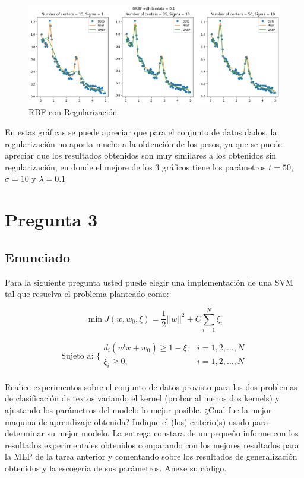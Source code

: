 \documentclass{article}
\theoremstyle{mytheoremstyle}
\theoremstyle{mytheoremstyle}
\theoremstyle{myproblemstyle}
\begin{document}
\begin{itemize}
        \begin{figure}[!ht]
          \centering
          \includegraphics[width=1\textwidth]{./imgs/RBF/rbf_r.png}
          \caption{RBF con Regularización}
          \label{fig:8}
        \end{figure}

        En estas gráficas se puede apreciar que para el conjunto de datos dados, la regularización no aporta mucho a la obtención de los pesos, ya que se puede apreciar que los resultados obtenidos son muy similares a los obtenidos sin regularización, en donde el mejore de los 3 gráficos tiene los parámetros $t=50$, $\sigma=10$ y $\lambda=0.1$

\end{itemize}

\newpage
\section*{Pregunta 3}

\subsection*{Enunciado}

Para la siguiente pregunta usted puede elegir una implementación de una SVM tal que resuelva el problema planteado como:

\begin{equation*}
  \min J(w, w_0, \xi) = \frac{1}{2}||w||^2 + C\sum_{i=1}^N \xi_i
\end{equation*}

\[
  \text{Sujeto a: } \bigg\{
  \begin{array}{cc}
    d_i(w^tx + w_0) \geq 1 - \xi, & i = 1, 2, \dots, N \\
    \xi_i \geq 0,                 & i = 1, 2, \dots, N \\
  \end{array}
\]

Realice experimentos sobre el conjunto de datos provisto para los dos problemas de clasificación de textos variando el kernel (probar al menos dos kernels) y ajustando los parámetros del modelo lo mejor posible. ¿Cual fue la mejor maquina de aprendizaje obtenida? Indique el (los) criterio(s) usado para determinar su mejor modelo. La entrega constara de un pequeño informe con los resultados experimentales obtenidos comparando con los mejores resultados para la MLP de la tarea anterior y comentando sobre los resultados de generalización obtenidos y la escogería de sus parámetros. Anexe su código.
\end{document}
